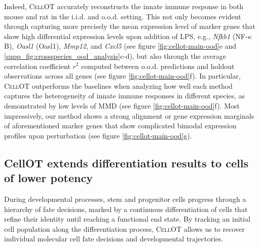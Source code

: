 Indeed, \textsc{CellOT} accurately reconstructs the innate immune response in both mouse and rat in the i.i.d. and o.o.d. setting.
This not only becomes evident through capturing more precisely the mean expression level of marker genes that show high differential expression levels upon addition of LPS, e.g., \textit{Nfkb1} (NF-$\kappa$B), \textit{Oasl1} (Oasl1), \textit{Mmp12}, and \textit{Cxcl5} (see figure \ref{fig:cellot-main-ood}e and \ref{supp_fig:crossspecies_ood_analysis}c-d), but also through the average correlation coefficient $r^2$ computed between o.o.d. predictions and holdout observations across all genes (see figure \ref{fig:cellot-main-ood}f).
In particular, \textsc{CellOT} outperforms the baselines when analyzing how well each method captures the heterogeneity of innate immune responses in different species, as demonstrated by low levels of MMD (see figure \ref{fig:cellot-main-ood}f).
Most impressively, our method shows a strong alignment or gene expression marginals of aforementioned marker genes that show complicated bimodal expression profiles upon perturbation (see figure \ref{fig:cellot-main-ood}g).

\subsection{CellOT extends differentiation results to cells of lower potency}

During developmental processes, stem and progenitor cells progress through a hierarchy of fate decisions, marked by a continuous differentiation of cells that refine their identity until reaching a functional end state.
By tracking an initial cell population along the differentiation process, \textsc{CellOT} allows us to recover individual molecular cell fate decisions and developmental trajectories. 

